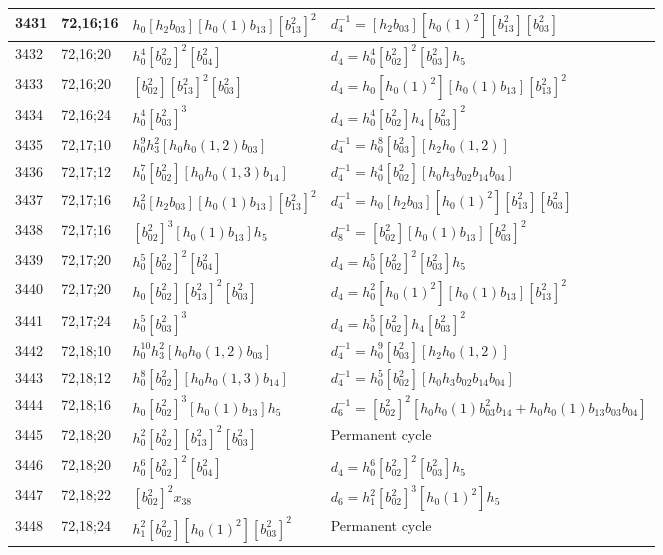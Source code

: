 \documentclass{article}
\begin{document}
\begin{longtable}{|l|l|>{\raggedright\arraybackslash}p{6cm}|>{\raggedright\arraybackslash}p{6cm}|}
\hline
3431 & 72,16;16 & $h_0[h_2b_{03}][h_0(1)b_{13}][b_{13}^2]^2$ & $d_{4}^{-1}=[h_2b_{03}][h_0(1)^2][b_{13}^2][b_{03}^2]$\\
\hline
3432 & 72,16;20 & $h_0^4[b_{02}^2]^2[b_{04}^2]$ &$d_{4}=h_0^4[b_{02}^2]^2[b_{03}^2]h_5$\\
3433 & 72,16;20 & $[b_{02}^2][b_{13}^2]^2[b_{03}^2]$ &$d_{4}=h_0[h_0(1)^2][h_0(1)b_{13}][b_{13}^2]^2$\\
\hline
3434 & 72,16;24 & $h_0^4[b_{03}^2]^3$ &$d_{4}=h_0^4[b_{02}^2]h_4[b_{03}^2]^2$\\
\hline
3435 & 72,17;10 & $h_0^9h_3^2[h_0h_0(1, 2)b_{03}]$ & $d_{4}^{-1}=h_0^8[b_{03}^2][h_2h_0(1, 2)]$\\
\hline
3436 & 72,17;12 & $h_0^7[b_{02}^2][h_0h_0(1, 3)b_{14}]$ & $d_{4}^{-1}=h_0^4[b_{02}^2][h_0h_3b_{02}b_{14}b_{04}]$\\
\hline
3437 & 72,17;16 & $h_0^2[h_2b_{03}][h_0(1)b_{13}][b_{13}^2]^2$ & $d_{4}^{-1}=h_0[h_2b_{03}][h_0(1)^2][b_{13}^2][b_{03}^2]$\\
3438 & 72,17;16 & $[b_{02}^2]^3[h_0(1)b_{13}]h_5$ & $d_{8}^{-1}=[b_{02}^2][h_0(1)b_{13}][b_{03}^2]^2$\\
\hline
3439 & 72,17;20 & $h_0^5[b_{02}^2]^2[b_{04}^2]$ &$d_{4}=h_0^5[b_{02}^2]^2[b_{03}^2]h_5$\\
3440 & 72,17;20 & $h_0[b_{02}^2][b_{13}^2]^2[b_{03}^2]$ &$d_{4}=h_0^2[h_0(1)^2][h_0(1)b_{13}][b_{13}^2]^2$\\
\hline
3441 & 72,17;24 & $h_0^5[b_{03}^2]^3$ &$d_{4}=h_0^5[b_{02}^2]h_4[b_{03}^2]^2$\\
\hline
3442 & 72,18;10 & $h_0^{10}h_3^2[h_0h_0(1, 2)b_{03}]$ & $d_{4}^{-1}=h_0^9[b_{03}^2][h_2h_0(1, 2)]$\\
\hline
3443 & 72,18;12 & $h_0^8[b_{02}^2][h_0h_0(1, 3)b_{14}]$ & $d_{4}^{-1}=h_0^5[b_{02}^2][h_0h_3b_{02}b_{14}b_{04}]$\\
\hline
3444 & 72,18;16 & $h_0[b_{02}^2]^3[h_0(1)b_{13}]h_5$ & $d_{6}^{-1}=[b_{02}^2]^2[h_0h_0(1)b_{03}^2b_{14} + h_0h_0(1)b_{13}b_{03}b_{04}]$\\
\hline
3445 & 72,18;20 & $h_0^2[b_{02}^2][b_{13}^2]^2[b_{03}^2]$ & Permanent cycle\\
3446 & 72,18;20 & $h_0^6[b_{02}^2]^2[b_{04}^2]$ &$d_{4}=h_0^6[b_{02}^2]^2[b_{03}^2]h_5$\\
\hline
3447 & 72,18;22 & $[b_{02}^2]^2x_{38}$ &$d_{6}=h_1^2[b_{02}^2]^3[h_0(1)^2]h_5$\\
\hline
3448 & 72,18;24 & $h_1^2[b_{02}^2][h_0(1)^2][b_{03}^2]^2$ & Permanent cycle\\

\end{longtable}
\end{document}

